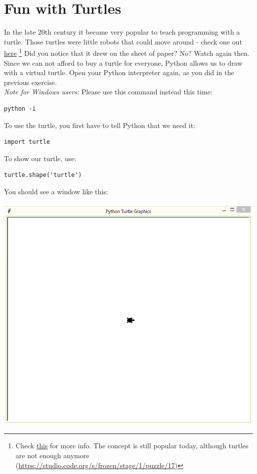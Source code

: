 \documentclass{article}
\begin{document}
\section{Fun with Turtles}
In the late 20th century it became very popular to teach programming with a
turtle. Those turtles were little robots that could move around - check one
out \href{https://youtu.be/8wU6NdjTVTA}{here}
\footnote{Check \href{https://en.wikipedia.org/wiki/Turtle_(robot)}{this} for more info.
The concept is still popular today, although turtles are not enough anymore
(\href{https://studio.code.org/s/frozen/stage/1/puzzle/17}{https://studio.code.org/s/frozen/stage/1/puzzle/17})
}
Did you notice that it drew on the sheet of paper? No? Watch again then.\\
Since we can not afford to buy a turtle for everyone, Python allows us to draw
with a virtual turtle. Open your Python interpreter again, as you did in the
previous exercise.\\
\textit{Note for Windows users:} Please use this command instead this time:
\begin{lstlisting}
python -i
\end{lstlisting}
To use the turtle, you first have to tell Python that we need it:
\begin{lstlisting}
import turtle
\end{lstlisting}
To show our turtle, use:
\begin{lstlisting}
turtle.shape('turtle')
\end{lstlisting}
You should see a window like this:\\\\
\includegraphics[scale=0.6]{Ex_1_Turtle}\\
\end{document}
